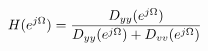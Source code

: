 \documentclass[preview]{standalone}
\begin{document}
\begin{align*}
\special{dvisvgm:raw <g id='unique000'>}H(e^{j\Omega})= \special{dvisvgm:raw </g>}\special{dvisvgm:raw <g id='unique001'>}\frac{D_{yy}(e^{j\Omega})}{D_{yy}(e^{j\Omega})+D_{vv}(e^{j\Omega})}\special{dvisvgm:raw </g>}
\end{align*}
\end{document}
